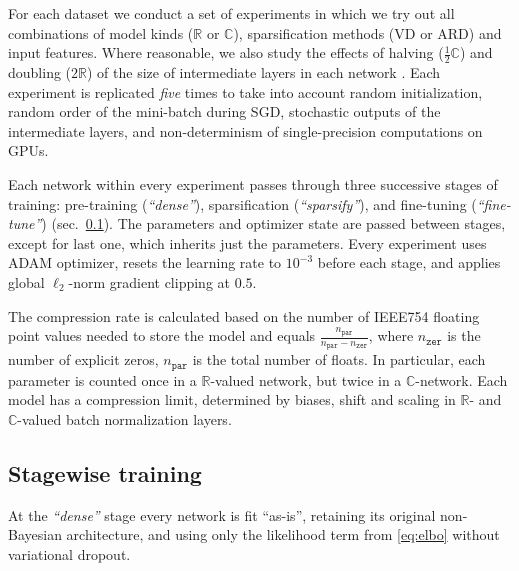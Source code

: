 \documentclass[a4paper,10pt,onecolumn]{article}
\newcommand{\real}{\mathbb{R}}
\newcommand{\cplx}{\mathbb{C}}
\begin{document}
For each dataset we conduct a set of experiments in which we try out all combinations of
model kinds ($\real$ or $\cplx$), sparsification methods (VD or ARD) and input features.
Where reasonable, we also study the effects of halving ($\tfrac12\cplx$) and doubling ($2\real$)
of the size of intermediate layers in each network \citep{monning_evaluation_2018}.
%
Each experiment is replicated \textit{five} times to take into account random initialization,
random order of the mini-batch during SGD, stochastic outputs of the intermediate layers,
and non-determinism of single-precision computations on GPUs.

Each network within every experiment passes through three successive stages of training:
pre-training (\textit{``dense''}), sparsification (\textit{``sparsify''}), and fine-tuning
(\textit{``fine-tune''}) (sec.~\ref{sub:staging}). The parameters and optimizer state are
passed between stages, except for last one, which inherits just the parameters.
%
Every experiment uses ADAM optimizer, resets the learning rate to $10^{-3}$ before each
stage, and applies global $\ell_2$-norm gradient clipping at $0.5$.

The compression rate is calculated based on the number of IEEE754 floating point values
needed to store the model and equals $
  \tfrac{n_\mathtt{par}}{n_\mathtt{par} - n_\mathtt{zer}}
$, where $n_\mathtt{zer}$ is the number of explicit zeros, $n_\mathtt{par}$ is the total
number of floats. In particular, each parameter is counted once in a $\real$-valued network,
but twice in a $\cplx$-network. Each model has a compression limit, determined by biases,
shift and scaling in $\real$- and $\cplx$-valued batch normalization layers.

\subsection{Stagewise training} %
\label{sub:staging}


At the \textit{``dense''} stage every network is fit ``as-is'', retaining its original
non-Bayesian architecture, and using only the likelihood term from \eqref{eq:elbo} without
variational dropout.
\end{document}
